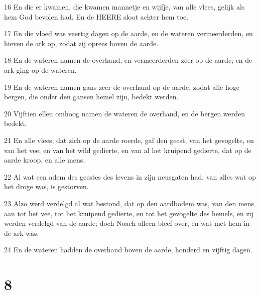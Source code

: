 \par 16 En die er kwamen, die kwamen mannetje en wijfje, van alle vlees, gelijk als hem God bevolen had. En de HEERE sloot achter hem toe.
\par 17 En die vloed was veertig dagen op de aarde, en de wateren vermeerderden, en hieven de ark op, zodat zij oprees boven de aarde.
\par 18 En de wateren namen de overhand, en vermeerderden zeer op de aarde; en de ark ging op de wateren.
\par 19 En de wateren namen gans zeer de overhand op de aarde, zodat alle hoge bergen, die onder den gansen hemel zijn, bedekt werden.
\par 20 Vijftien ellen omhoog namen de wateren de overhand, en de bergen werden bedekt.
\par 21 En alle vlees, dat zich op de aarde roerde, gaf den geest, van het gevogelte, en van het vee, en van het wild gedierte, en van al het kruipend gedierte, dat op de aarde kroop, en alle mens.
\par 22 Al wat een adem des geestes des levens in zijn neusgaten had, van alles wat op het droge was, is gestorven.
\par 23 Alzo werd verdelgd al wat bestond, dat op den aardbodem was, van den mens aan tot het vee, tot het kruipend gedierte, en tot het gevogelte des hemels, en zij werden verdelgd van de aarde; doch Noach alleen bleef over, en wat met hem in de ark was.
\par 24 En de wateren hadden de overhand boven de aarde, honderd en vijftig dagen.

\chapter{8}

